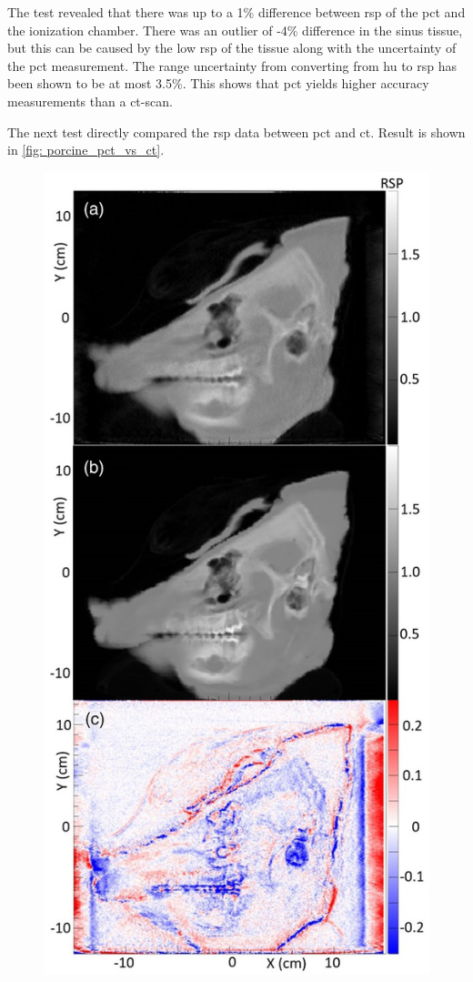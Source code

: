 \documentclass[main.tex]{subfiles}
\begin{document}
The test revealed that there was up to a 1\% difference between \gls{rsp} of the \gls{pct} and the ionization chamber. There was an outlier of -4\% difference in the sinus tissue, but this can be caused by the low \gls{rsp} of the tissue along with the uncertainty of the \gls{pct} measurement. The range uncertainty from converting from \gls{hu} to \gls{rsp} has been shown to be at most 3.5\%\cite{Paganetti_2012}. This shows that \gls{pct} yields higher accuracy measurements than a \gls{ct}-scan. 


The next test directly compared the \gls{rsp} data between \gls{pct} and \gls{ct}. Result is shown in \autoref{fig: porcine_pct_vs_ct}.

\begin{figure}[!ht]
    \centering
    \includegraphics[scale=2.5]{images/porcine_comparison.jpg}

\end{figure}
\end{document}
